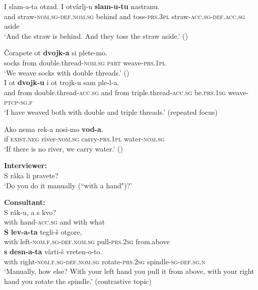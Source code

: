 \documentclass[output=paper,colorlinks,citecolor=brown]{langscibook}
\begin{document}
\begin{exe}
	\ex
	\begin{xlist}
		\ex \label{05ex19a}
		\gll I slam-a-ta otzad. I otvârlj-u \textbf{slam-u-tu} nastranu. \\
		and straw-\textsc{nom.sg-def.nom.sg} behind and toss-\textsc{prs.3pl} straw-\textsc{acc.sg-def.acc.sg} aside \\
		\trans ‘And the straw is behind. And they toss the straw aside.’ \hfill ()
		
		\ex \label{05ex19b}
		\gll Čorapete ot \textbf{dvojk-a} si plete-mo. \\
		socks from double.thread-\textsc{nom.sg} \textsc{part} weave-\textsc{prs.1pl} \\
		\trans ‘We weave socks with double threads.’ \hfill () \\[1ex]
		\gll I ot \textbf{dvojk-u} i ot trojk-u sam ple-l-a. \\
		and from double.thread-\textsc{acc.sg} and from triple.thread-\textsc{acc.sg} be.\textsc{prs.1sg} weave-\textsc{ptcp-sg.f} \\
		\trans ‘I have weaved both with double and triple threads.’ \hfill (repeated focus)
		
		\ex \label{05ex19c}
		\gll Ako nema rek-a nosi-mo \textbf{vod-a}. \\
		if \textsc{exist.neg} river-\textsc{nom.sg} carry-\textsc{prs.1pl} water-\textsc{nom.sg} \\
		\trans ‘If there is no river, we carry water.’ \hfill ()
		
		\ex \label{05ex19d}
		\textbf{Interviewer:} \\
		S râka li pravete? \\
		‘Do you do it manually (``with a hand")?’ \\
		
		\medskip
		
		\textbf{Consultant:} \\
		\gll S râk-u, a s kvo? \\
		with hand-\textsc{acc.sg} and with what \\
		\gll \textbf{S} \textbf{lev-a-ta} tegli-š otgore, \\
		with left-\textsc{nom.f.sg-def.nom.sg} pull-\textsc{prs.2sg} from.above \\
		\gll \textbf{s} \textbf{desn-a-ta} vârti-š vreten-o-to. \\
		with right-\textsc{nom.f.sg-def.nom.sg} rotate-\textsc{prs.2sg} spindle-\textsc{sg-def.sg.n} \\
		\trans ‘Manually, how else? With your left hand you pull it from above, with your right hand you rotate the spindle.’ \hfill (contrastive topic)
	\end{xlist}
\end{exe}
\end{document}
